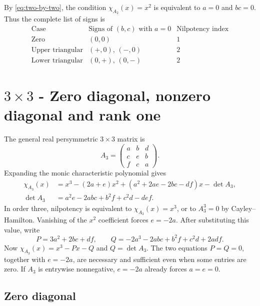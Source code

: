 \documentclass[11pt,a4paper]{article}
\begin{document}
By \eqref{eq:two-by-two}, the condition $\chi_{A_2}(x)=x^2$ is equivalent
to $a=0$ and $bc=0$. Thus the complete list of signs is
\[
\begin{array}{c|c|c}
\text{Case} & \text{Signs of }(b,c)\text{ with }a=0 & \text{Nilpotency index}\\ \hline
\text{Zero} & (0,0) & 1\\
\text{Upper triangular} & (+,0),\,(-,0) & 2\\
\text{Lower triangular} & (0,+),\,(0,-) & 2
\end{array}
\]

\section{\texorpdfstring{$3\times3$}{3 by 3} - Zero diagonal, nonzero diagonal and rank one}
\label{sec:dimension-three}

The general real persymmetric $3\times3$ matrix is
\begin{equation}\label{eq:three-by-three}
 A_3=\begin{pmatrix}a&b&d\\c&e&b\\f&c&a\end{pmatrix}.
\end{equation}
Expanding the monic characteristic polynomial gives
\begin{align}\label{eq:three-charpoly}
 \chi_{A_3}(x)
 &=x^3-(2a+e)x^2+(a^2+2ae-2bc-df)x-\det A_3,\\
 \det A_3&=a^2e-2abc+b^2f+c^2d-def.\nonumber
\end{align}
In order three, nilpotency is equivalent to $\chi_{A_3}(x)=x^3$,
or to $A_3^3=0$ by Cayley--Hamilton. Vanishing of the $x^2$ coefficient
forces $e=-2a$. After substituting this value, write
\begin{equation}\label{eq:nilpotent-conditions}
 P=3a^2+2bc+df,\qquad
 Q=-2a^3-2abc+b^2f+c^2d+2adf .
\end{equation}
Now $\chi_{A_3}(x)=x^3-Px-Q$ and $Q=\det A_3$. The two equations
$P=Q=0$, together with $e=-2a$, are necessary and sufficient even when
some entries are zero. If $A_3$ is entrywise nonnegative, $e=-2a$ already
forces $a=e=0$.

\subsection{Zero diagonal}
\label{sec:zero-diagonal-three}
\end{document}
